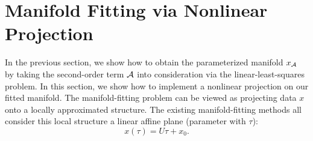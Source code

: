 \documentclass{article}
\newtheorem{theorem}{Theorem}[section]
\theoremstyle{remark}
\newtheorem*{remark}{Remark}
\begin{document}
%

\section{Manifold Fitting via Nonlinear Projection}
In the previous section, we show how to obtain the parameterized manifold $x_{\cal A}$ by taking the second-order term $\cal A$ into consideration via the linear-least-squares problem. In this section, we show how to implement a nonlinear projection on our fitted manifold. %
The manifold-fitting problem can be viewed as projecting data $x$ onto a locally approximated structure. The existing manifold-fitting methods all consider this local structure a linear affine plane (parameter with $\tau$):
\[
 x(\tau)  =  U \tau +x_0.
\]
\end{document}
